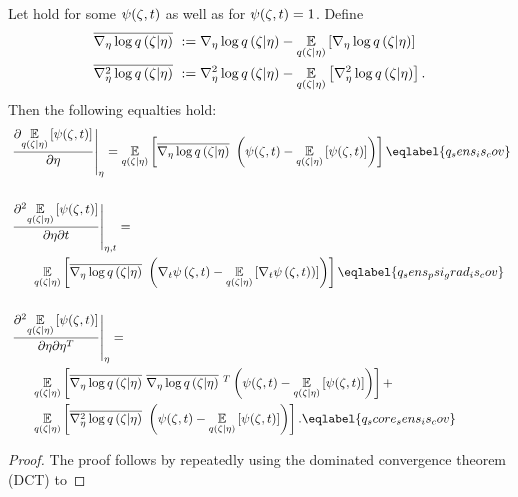

\begin{lem}
%
Let  hold for some $\psi(\zeta, t)$ as well as
for $\psi(\zeta, t) = 1$.  Define
%
\begin{align*}
%
\lqgradbar{\zeta \vert \eta} :={}& \lqgrad{\zeta \vert \eta}
  - \expect{\q(\zeta \vert \eta)}{\lqgrad{\zeta \vert \eta}} \\
\lqhessbar{\zeta \vert \eta} :={}& \lqhess{\zeta \vert \eta}
 - \expect{\q(\zeta \vert \eta)}{\lqhess{\zeta \vert \eta}}.
%
\end{align*}
%
Then the following equalties hold:
%
\begin{align}
%
\MoveEqLeft
\fracat{\partial \expect{\q(\zeta \vert \eta)}
              {\psi(\zeta, \t)}}{\partial \eta}{\eta} ={}
\expect{\q(\zeta \vert \eta)}
       {\lqgradbar{\zeta \vert \eta} \left(
        \psi(\zeta,\t) - \expect{\q(\zeta \vert \eta)}{\psi(\zeta, \t)}
       \right)
       }\eqlabel{q_sens_is_cov}\\\nonumber\\
%
\MoveEqLeft
\fracat{\partial^2 \expect{\q(\zeta \vert \eta)}
      {\psi(\zeta, \t)}}{\partial \eta \partial \t}{\eta, \t} ={}\nonumber\\&
  \expect{\q(\zeta \vert \eta)}
         {\lqgradbar{\zeta \vert \eta} \left(
          \psigrad{\zeta,\t} - \expect{\q(\zeta \vert \eta)}{\psigrad{\zeta, \t})}
         \right)
         } \eqlabel{q_sens_psi_grad_is_cov} \\\nonumber\\
 \MoveEqLeft
 \fracat{\partial^2 \expect{\q(\zeta \vert \eta)}
       {\psi(\zeta, \t)}}{\partial \eta \partial \eta^T}{\eta} ={}
 \nonumber\\&
 \expect{\q(\zeta \vert \eta)}
        {\lqgradbar{\zeta \vert \eta} \lqgradbar{\zeta \vert \eta}^T
        \left(
         \psi(\zeta,\t) - \expect{\q(\zeta \vert \eta)}{\psi(\zeta, \t)}
        \right)
        } +
 \nonumber\\ &
 \expect{\q(\zeta \vert \eta)}{
        \lqhessbar{\zeta \vert \eta}
        \left(
         \psi(\zeta,\t) - \expect{\q(\zeta \vert \eta)}{\psi(\zeta, \t)}
        \right)
        }. \eqlabel{q_score_sens_is_cov}
%
\end{align}
%
\begin{proof}
%
The proof follows by repeatedly using the dominated convergence theorem (DCT) to

\end{proof}
\end{lem}
